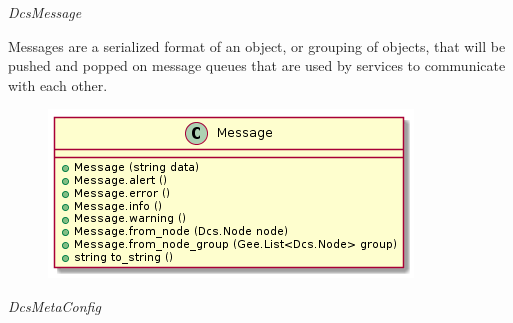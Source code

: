       \emph{DcsMessage}

      \vspace*{-0.75cm}
      \begin{minipage}[t]{0.5\textwidth}
      	\vspace*{0.5cm}
        Messages are a serialized format of an object, or grouping of objects,
        that will be pushed and popped on message queues that are used by
        services to communicate with each other.
      \end{minipage} \hfill
      \begin{minipage}[t]{0.45\textwidth}
        \begin{figure}[H]
          \includegraphics[width=\textwidth]{figures/design/class/core/message}
          \label{fig:dsg-classes-message}
        \end{figure}
      \end{minipage}

      \emph{DcsMetaConfig}

